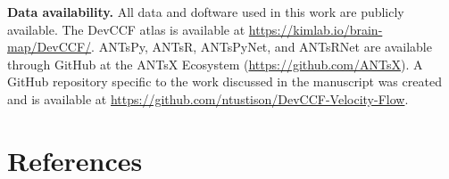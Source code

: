 \documentclass[
  12pt,
]{article}
\begin{document}
\clearpage
\newpage

\textbf{Data availability.} All data and doftware used in this work are
publicly available. The DevCCF atlas is available at
\url{https://kimlab.io/brain-map/DevCCF/}. ANTsPy, ANTsR, ANTsPyNet, and
ANTsRNet are available through GitHub at the ANTsX Ecosystem
(\url{https://github.com/ANTsX}). A GitHub repository specific to the
work discussed in the manuscript was created and is available at
\url{https://github.com/ntustison/DevCCF-Velocity-Flow}.

\clearpage

\hypertarget{references}{%
\section*{References}\label{references}}
\end{document}
